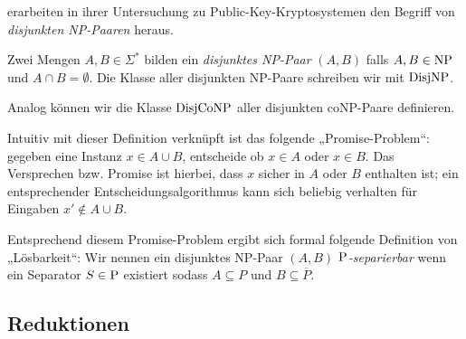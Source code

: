 \textcite{grollmann_complexity_1988} erarbeiten in ihrer Untersuchung zu Public-Key-Kryptosystemen den Begriff von \emph{disjunkten NP-Paaren} heraus.

\begin{definition}[$\DisjNP, \DisjCoNP$]
    Zwei Mengen $A,B\in\Sigma^*$ bilden ein \emph{disjunktes NP-Paar} $(A,B)$ falls $A,B\in\NP$ und $A\cap B = \emptyset$.
    Die Klasse aller disjunkten NP-Paare schreiben wir mit $\DisjNP$.
    
    Analog können wir die Klasse $\DisjCoNP$ aller disjunkten coNP-Paare definieren.
\end{definition}
Intuitiv mit dieser Definition verknüpft ist das folgende „Promise-Problem“: gegeben eine Instanz $x\in A\cup B$, entscheide ob $x\in A$ oder $x\in B$. Das Versprechen bzw. Promise ist hierbei, dass $x$ sicher in $A$ oder $B$ enthalten ist; ein entsprechender Entscheidungsalgorithmus kann sich beliebig verhalten für Eingaben $x'\not\in A\cup B$.

Entsprechend diesem Promise-Problem ergibt sich formal folgende Definition von „Lösbarkeit“:
Wir nennen ein disjunktes NP-Paar $(A,B)$ \emph{$\P$-separierbar} wenn ein Separator $S\in\P$ existiert sodass $A\subseteq P$ und $B\subseteq\overline{P}$.

\subsection*{Reduktionen}

